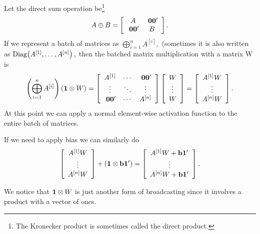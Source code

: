 \documentclass{sapthesis}
\begin{document}
Let the direct sum operation be\footnote{The Kronecker product is sometimes
called the direct product.} \[ A \oplus B =
\left[\begin{array}{cc}A&\Z\\\Z&B\end{array}\right].\] If we represent a batch
of matrices as \(\bigoplus_{i=1}^n A^{[i]},\) (sometimes it is also written as
\(\mathrm{Diag}\!\left(A^{[1]},\ldots,A^{[n]}\right),\) then the batched matrix
multiplication with a matrix W is \[
\left(\bigoplus_{i=1}^n A^{[i]}\right) (\vec 1 \krone W)
= \left[\begin{array}{ccc}
    A^{[1]} & \cdots & \Z \\
    \vdots & \ddots & \vdots \\
    \Z & \cdots & A^{[n]}
\end{array}\right]
\left[\begin{array}{c}W \\ \vdots \\ W \end{array}\right]
= \left[\begin{array}{c}A^{[1]} W \\ \vdots \\ A^{[n]} W\end{array}\right].\]
At this point we can apply a normal element-wise activation function to the
entire batch of matrices.

If we need to apply bias we can similarly do \[
\left[\begin{array}{c}A^{[1]} W\\ \vdots \\ A^{[n]} W\end{array}\right]
+ (\mathbf{1} \otimes \mathbf{b} \mathbf{1}')
= \left[\begin{array}{c}
    A^{[1]} W + \mathbf{b} \mathbf{1}' \\ \vdots \\ A^{[n]} W + \mathbf{b} \mathbf{1}'
\end{array}\right].
\]

We notice that \(\mathbf{1} \otimes W\) is just another form of broadcasting since it
involves a product with a vector of ones.
\end{document}
